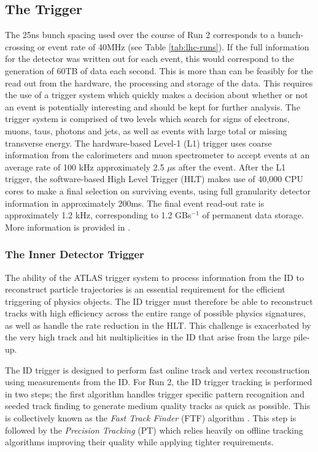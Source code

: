 \subsection{The Trigger}
The 25ns bunch spacing used over the course of Run 2 corresponds to a bunch-crossing or event rate of 40MHz (see Table \ref{tab:lhc-runs}). If the full information for the detector was written out for each event, this would correspond to the generation of 60TB of data each second. This is more than can be feasibly for the read out from the hardware, the processing and storage of the data. This requires the use of a trigger system which quickly makes a decision about whether or not an event is potentially interesting and should be kept for further analysis. The trigger system is comprised of two levels which search for signs of electrons, muons, taus, photons and jets, as well as events with large total or missing transverse energy. The hardware-based Level-1 (L1) trigger uses coarse information from the calorimeters and muon spectrometer to accept events at an average rate of 100 kHz approximately 2.5 $\mu$s after the event. After the L1 trigger, the software-based High Level Trigger (HLT) makes use of 40,000 CPU cores to make a final selection on surviving events, using full granularity detector information in approximately 200ms. The final event read-out rate is approximately 1.2 kHz, corresponding to 1.2 GBs$^{-1}$ of permanent data storage. More information is provided in \cite{TRIG-2016-01}.


\subsubsection{The Inner Detector Trigger}

The ability of the ATLAS trigger system to process information from the ID to reconstruct particle trajectories is an essential requirement for the efficient triggering of physics objects. The ID trigger must therefore be able to reconstruct tracks with high efficiency across the entire range of possible physics signatures, as well as handle the rate reduction in the HLT. This challenge is exacerbated by the very high track and hit multiplicities in the ID that arise from the large pile-up. 

The ID trigger is designed to perform fast online track and vertex reconstruction using measurements from the ID. For Run 2, the ID trigger tracking is performed in two steps; the first algorithm handles trigger specific pattern recognition and seeded track finding to generate medium quality tracks as quick as possible. This is collectively known as the \textit{Fast Track Finder} (FTF) algorithm \cite{Penc:2104217, Grandi:2624768}. This step is followed by the \textit{Precision Tracking} (PT) which relies heavily on offline tracking algorithms \cite{T_Cornelissen_2008} improving their quality while applying tighter requirements. 



